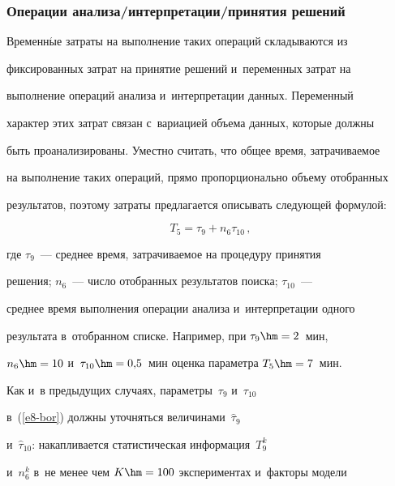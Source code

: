       


      \subsubsection{Операции анализа\!/\!интерпретации\!/\!принятия решений}


      


      Временн$\acute{\mbox{ы}}$е затраты на выполнение таких операций складываются из 


фиксированных затрат на принятие решений и~переменных затрат на 


выполнение операций анализа и~интерпретации данных. Переменный 


характер этих затрат связан с~вариацией объема данных, которые должны 


быть проанализированы. Уместно считать, что общее время, затрачиваемое 


на выполнение таких операций, прямо пропорционально объему отобранных 


результатов, поэтому затраты предлагается описывать следующей формулой:


      \begin{equation}


      T_5=\tau_9+n_6\tau_{10}\,,


      \label{e8-bor}


      \end{equation}


где $\tau_9$~--- среднее время, затрачиваемое на процедуру принятия 


решения; $n_6$~--- число отобранных результатов поиска; $\tau_{10}$~--- 


среднее время выполнения операции анализа и~интерпретации одного 


результата в~отобранном списке. Например, при $\tau_9\hm = 2$~мин, 


$n_6\hm = 10$ и~$\tau_{10}\hm = 0{,}5$~мин оценка параметра $T_5\hm = 


7$~мин.





      Как и~в предыдущих случаях, параметры~$\tau_9$ и~$\tau_{10}$ 


в~(\ref{e8-bor}) должны уточняться величинами~$\hat{\tau}_9$ 


и~$\hat{\tau}_{10}$: накапливается статистическая информация~$T_9^k$ 


и~$n_6^k$ в~не менее чем $K\hm = 100$ экспериментах и~факторы модели 


